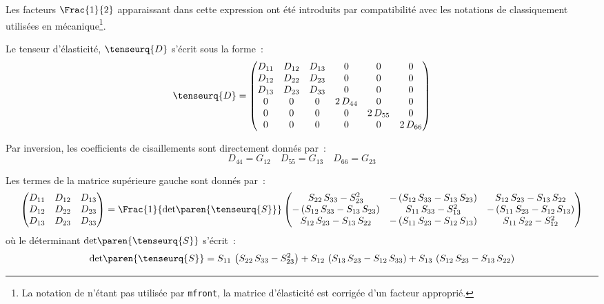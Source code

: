 \documentclass[rectoverso,pleiades,pstricks,leqno,anti]{texmf/note_technique_2010}
\newcommand{\mfront}{\texttt{mfront}}
\begin{document}
Les facteurs \(\Frac{1}{2}\) apparaissant dans cette expression ont
été introduits par compatibilité avec les notations de 
classiquement utilisées en mécanique\footnote{La notation de
   n'étant pas utilisée par \mfront{}, la matrice
  d'élasticité est corrigée d'un facteur approprié.}.

Le tenseur d'élasticité, \(\tenseurq{D}\) s'écrit sous la forme~:
\[
\tenseurq{D}=
\begin{pmatrix}
  D_{11} & D_{12} & D_{13} & 0 & 0 & 0 \\
  D_{12} & D_{22} & D_{23} & 0 & 0 & 0 \\
  D_{13} & D_{23} & D_{33} & 0 & 0 & 0 \\
  0 & 0 & 0 & 2\,D_{44} & 0  & 0 \\
  0 & 0 & 0 & 0        & 2\,D_{55} & 0 \\
  0 & 0 & 0 & 0        & 0 & 2\, D_{66} \\
\end{pmatrix}
\]

Par inversion, les coefficients de cisaillements sont directement
donnés par~:
\[
D_{44}=G_{12} \quad D_{55}=G_{13} \quad D_{66}=G_{23}
\]

Les termes de la matrice supérieure gauche sont donnés par~:
\[
\begin{pmatrix}
  D_{11} & D_{12} & D_{13} \\
  D_{12} & D_{22} & D_{23} \\
  D_{13} & D_{23} & D_{33} \\
\end{pmatrix} = 
\Frac{1}{\text{det}\paren{\tenseurq{S}}}
\begin{pmatrix}
  S_{22}\,S_{33}-S_{23}^2&-\left(S_{12}\,S_{33}-S_{13}\,S_{23}\right)& S_{12}\,S_{23}-S_{13}\,S_{22}\\
  -\left(S_{12}\,S_{33}-S_{13}\,S_{23}\right)&S_{11}\,S_{33}-S_{13}^2&-\left(S_{11}\,S_{23}-S_{12}\,S_{13}\right)\\
  S_{12}\,S_{23}-S_{13}\,S_{22}&-\left(S_{11}\,S_{23}-S_{12}\,S_{13}\right)&S_{11}\,S_{22}-S_{12}^2\\ 
\end{pmatrix}
\]
où le déterminant \(\text{det}\paren{\tenseurq{S}}\) s'écrit~:
\[
\text{det}\paren{\tenseurq{S}} = 
S_{11}\,\left(S_{22}\,S_{33}-S_{23}^2\right)+
S_{12}\,\left(S_{13}\,S_{23}-S_{12}\,S_{33}\right)+
S_{13}\,\left(S_{12}\,S_{23}-S_{13}\,S_{22}\right)
\]


\end{document}
